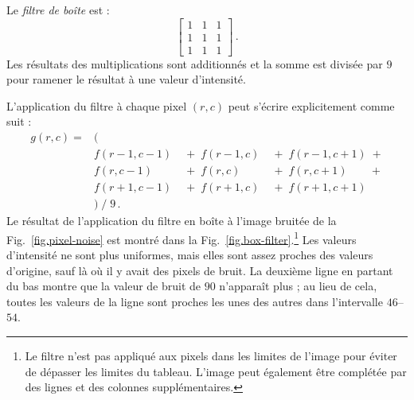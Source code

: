 Le \emph{filtre de boîte} est :
\[
\left[
\begin{array}{ccc}
1 & 1 & 1\\
1 & 1 & 1\\
1 & 1 & 1
\end{array}
\right]\,.
\]
Les résultats des multiplications sont additionnés et la somme est divisée par $9$ pour ramener le résultat à une valeur d'intensité.

L'application du filtre à chaque pixel $(r,c)$ peut s'écrire explicitement comme suit :
\[
\begin{array}{llll}
g(r,c) = &(\\
&f(r-1,c-1) & \;+\; f(r-1,c) & \;+\; f(r-1,c+1) \;+\\
&f(r,c-1) & \;+\; f(r,c) & \;+\; f(r,c+1) \;\;\;\;\;\;\;+\\
&f(r+1,c-1) & \;+\; f(r+1,c) & \;+\; f(r+1,c+1)\\
& ) \; / \; 9\,.
\end{array}
\]
Le résultat de l'application du filtre en boîte à l'image bruitée de la Fig.~\ref{fig.pixel-noise} est montré dans la Fig.~\ref{fig.box-filter}.\footnote{Le filtre n'est pas appliqué aux pixels dans les limites de l'image pour éviter de dépasser les limites du tableau. L'image peut également être complétée par des lignes et des colonnes supplémentaires.} Les valeurs d'intensité ne sont plus uniformes, mais elles sont assez proches des valeurs d'origine, sauf là où il y avait des pixels de bruit. La deuxième ligne en partant du bas montre que la valeur de bruit de $90$ n'apparaît plus ; au lieu de cela, toutes les valeurs de la ligne sont proches les unes des autres dans l'intervalle $46$--$54$.

